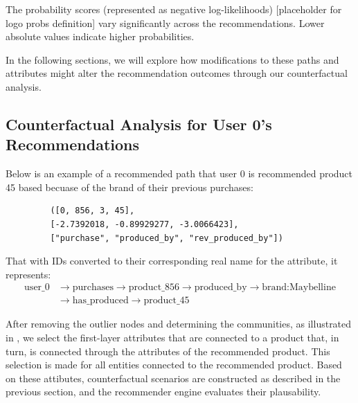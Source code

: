 \par
\vspace{1em}
The probability scores (represented as negative log-likelihoods)  [placeholder for logo probs definition] vary significantly
across the recommendations. Lower absolute values indicate higher
probabilities. 

In the following sections, we will explore how modifications to
these paths and attributes might alter the recommendation outcomes through our
counterfactual analysis.

\subsection{Counterfactual Analysis for User 0’s Recommendations}


Below is an example of a recommended path that user 0 is recommended product 45 based becuase of 
the brand of their previous purchases:
\begin{center}
	{\footnotesize
	\begin{verbatim}
		 ([0, 856, 3, 45],
		 [-2.7392018, -0.89929277, -3.0066423],
		 ["purchase", "produced_by", "rev_produced_by"])
	\end{verbatim}
	}
\end{center}
That with IDs converted to their corresponding real name for the attribute, it represents: 
\begin{align*}
	\text{user\_0} & \rightarrow \text{purchases}\rightarrow \text{product\_856}\rightarrow \text{produced\_by}\rightarrow \text{brand:Maybelline} \\
	               & \rightarrow \text{has\_produced}\rightarrow \text{product\_45}
\end{align*}

After removing the outlier nodes and determining the communities, as illustrated
in , we select the first-layer attributes that are connected to
a product that, in turn, is connected through the attributes of the recommended
product. This selection is made for all entities connected to the recommended product.
Based on these attibutes, counterfactual scenarios are constructed as described in the previous
section, and the recommender engine evaluates their plausability. 

